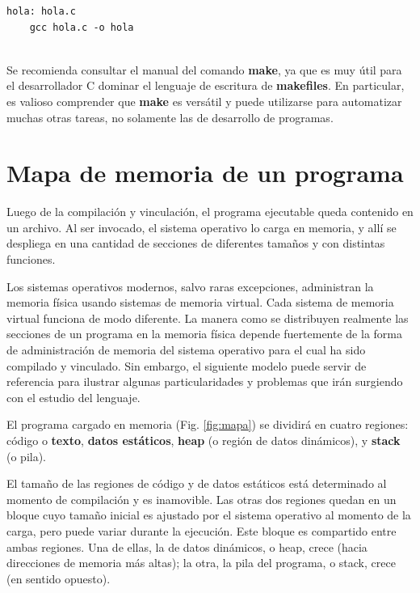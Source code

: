 \begin{lstlisting}
hola: hola.c
	gcc hola.c -o hola
	
\end{lstlisting}

Se recomienda consultar el manual del comando \textbf{make}, ya que es muy útil para el desarrollador C dominar el lenguaje de escritura de \textbf{makefiles}. En particular, es valioso comprender que \textbf{make} es versátil y puede utilizarse para automatizar muchas otras tareas, no solamente las de desarrollo de programas.


\section{Mapa de memoria de un programa}
Luego de la compilación y vinculación, el programa ejecutable queda contenido en un archivo. Al ser invocado, el sistema operativo lo carga en memoria, y allí se despliega en una cantidad de secciones de diferentes tamaños y con distintas funciones. 

Los sistemas operativos modernos, salvo raras excepciones, administran la memoria física  usando sistemas de memoria virtual. Cada sistema de memoria virtual funciona de modo diferente. La manera como se distribuyen realmente las secciones de un programa en la memoria física depende fuertemente de la
forma de administración de memoria del sistema operativo para el cual ha sido compilado y vinculado. Sin embargo,
el siguiente modelo puede servir de referencia para ilustrar algunas particularidades y problemas
que irán surgiendo con el estudio del lenguaje.

El programa cargado en memoria (Fig. \ref{fig:mapa}) se dividirá en cuatro regiones: código o \textbf{texto}, \textbf{datos
estáticos}, \textbf{heap} (o región de datos dinámicos), y \textbf{stack} (o pila). 

El tamaño de las regiones de código y de datos estáticos está determinado al momento de compilación
y es inamovible. Las otras dos regiones quedan en un bloque cuyo tamaño inicial es ajustado por el
sistema operativo al momento de la carga, pero puede variar durante la ejecución. Este bloque es
compartido entre ambas regiones. Una de ellas, la de datos dinámicos, o heap, crece  (hacia 
direcciones de memoria más altas); la otra, la pila del programa, o stack, crece  (en
sentido opuesto).



